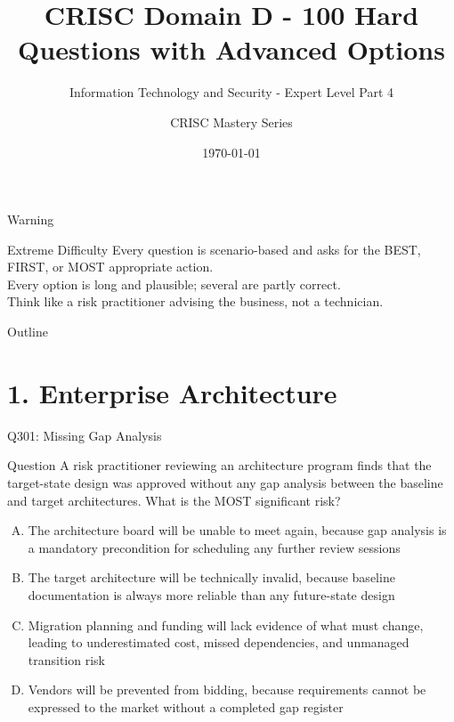 \documentclass{beamer}
\title{CRISC Domain D - 100 Hard Questions with Advanced Options}
\subtitle{Information Technology and Security - Expert Level Part 4}
\author{CRISC Mastery Series}
\date{\today}
\begin{document}
	
	\begin{frame}
		\titlepage
	\end{frame}
	
	\begin{frame}{Warning}
		\begin{alertblock}{Extreme Difficulty}
			Every question is scenario-based and asks for the BEST, FIRST, or MOST appropriate action.\\
			Every option is long and plausible; several are partly correct.\\
			Think like a risk practitioner advising the business, not a technician.
		\end{alertblock}
	\end{frame}
	
	\begin{frame}{Outline}
		\tableofcontents
	\end{frame}
	
	\section{1. Enterprise Architecture}
	
	\begin{frame}{Q301: Missing Gap Analysis}
		\begin{block}{Question}
			\small A risk practitioner reviewing an architecture program finds that the target-state design was approved without any gap analysis between the baseline and target architectures. What is the MOST significant risk?
		\end{block}
		\begin{enumerate}[(A)]
			\footnotesize
			\item The architecture board will be unable to meet again, because gap analysis is a mandatory precondition for scheduling any further review sessions
			\item The target architecture will be technically invalid, because baseline documentation is always more reliable than any future-state design
			\item Migration planning and funding will lack evidence of what must change, leading to underestimated cost, missed dependencies, and unmanaged transition risk
			\item Vendors will be prevented from bidding, because requirements cannot be expressed to the market without a completed gap register
		\end{enumerate}
	\end{frame}
	
\end{document}
